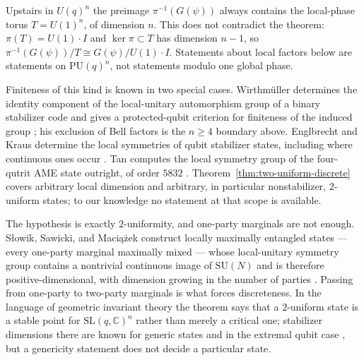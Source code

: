 \begin{remark}
\label{rem:local-phase-torus}
Upstairs in \(U(q)^n\) the preimage \(\pi^{-1}(G(\psi))\) always contains
the local-phase torus \(T=U(1)^n\), of dimension \(n\).  This does not
contradict the theorem: \(\pi(T)=U(1)\cdot I\) and \(\ker\pi\subset T\) has
dimension \(n-1\), so
\(\pi^{-1}(G(\psi))/T\cong G(\psi)/U(1)\cdot I\).  Statements about local
factors below are statements on \(\mathrm{PU}(q)^n\), not statements
modulo one global phase.
\end{remark}

\begin{remark}
\label{rem:discreteness-prior-art}
Finiteness of this kind is known in two special cases.  Wirthm\"uller
determines the identity component of the local-unitary automorphism group
of a binary stabilizer code and gives a protected-qubit criterion for
finiteness of the induced group
\cite[Theorem~7 and Corollary~11]{Wirthmuller2011}; his exclusion of Bell
factors is the \(n\geq4\) boundary above.  Englbrecht and Kraus determine
the local symmetries of qubit stabilizer states, including where continuous
ones occur \cite{EnglbrechtKraus2020}.  Tan computes the local symmetry
group of the four-qutrit AME state outright, of order \(5832\)
\cite[Theorem~5.3]{Tan2026}.  Theorem~\ref{thm:two-uniform-discrete} covers
arbitrary local dimension and arbitrary, in particular nonstabilizer,
\(2\)-uniform states; to our knowledge no statement at that scope is
available.

The hypothesis is exactly \(2\)-uniformity, and one-party marginals are
not enough.  S{\l}owik, Sawicki, and Maci\k{a}\.zek construct locally
maximally entangled states --- every one-party marginal maximally mixed
--- whose local-unitary symmetry group contains a nontrivial continuous
image of \(\mathrm{SU}(N)\) and is therefore positive-dimensional, with
dimension growing in the number of parties
\cite[Lemma~2]{SlowikSawickiMaciazek2021}.  Passing from one-party to
two-party marginals is what forces discreteness.  In the language of
geometric invariant theory the theorem says that a \(2\)-uniform state is a
stable point for \(\mathrm{SL}(q,\mathbb C)^n\) rather than merely a
critical one; stabilizer dimensions there are known for generic states and
in the extremal qubit case
\cite{BryanReichsteinVanRaamsdonk2018,%
BryanLeutheusserReichsteinVanRaamsdonk2019,LyonsWalckBlanda2008,%
GourKrausWallach2017}, but a genericity statement does not decide a
particular state.
\end{remark}

